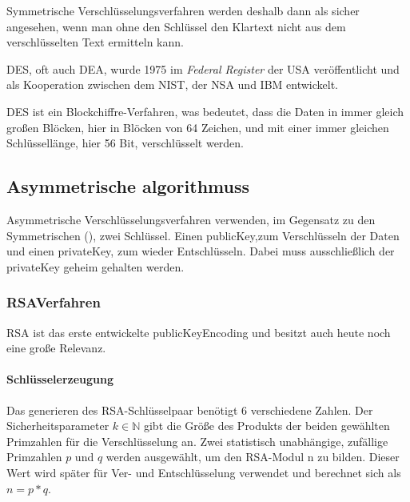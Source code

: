 Symmetrische Verschlüsselungsverfahren werden deshalb dann als sicher angesehen, wenn man ohne den Schlüssel den Klartext nicht aus dem verschlüsselten Text ermitteln kann.\autocite[\pagef~5]{kryptographische-algorithmen}

\ac{DES}, oft auch \ac{DEA}, wurde 1975 im \textit{Federal Register} der USA
veröffentlicht und als Kooperation zwischen dem \ac{NIST}, der \ac{NSA} und \ac{IBM} entwickelt.\autocite[\pagef~232]{nsa-meyer}

\ac{DES} ist ein Blockchiffre-Verfahren, was bedeutet, dass die Daten in immer gleich großen Blöcken, hier in Blöcken von 64 Zeichen, und mit einer immer gleichen Schlüssellänge, hier 56 Bit, verschlüsselt werden.\autocite[\pagef~6]{kryptographische-algorithmen}


\subsection[Asymmetrische Algorithmen]{Asymmetrische \glspl{algorithmus}}\label{subsec:asymmetrische-algorithmen}
Asymmetrische Verschlüsselungsverfahren verwenden, im Gegensatz zu den Symmetrischen (\solol), zwei Schlüssel.
Einen \gls{publicKey},zum Verschlüsseln der Daten und einen \gls{privateKey}, zum wieder Entschlüsseln.
Dabei muss ausschließlich der \gls{privateKey} geheim gehalten werden.


\subsubsection[RSA-Verfahren]{\acs{RSA}\nonbreakdash Verfahren}\label{subsubsec:rsa-verfahren}

\ac{RSA} ist das erste entwickelte \gls{publicKeyEncoding} und besitzt auch heute noch eine große Relevanz.\autocite[\pagef~168]{buchmann-einfuhrung-2016}

\paragraph[Schlüsselerzeugung]{Schlüsselerzeugung}\label{par:schluesselerzeugung}
Das generieren des \ac{RSA}-Schlüsselpaar benötigt $6$ verschiedene Zahlen. Der Sicherheitsparameter $k \in \mathbb{N}$ gibt die Größe des Produkts der beiden gewählten Primzahlen für die Verschlüsselung an. Zwei statistisch unabhängige, zufällige Primzahlen $p$ und $q$ werden ausgewählt, um den \ac{RSA}-Modul n zu bilden. Dieser Wert wird später für Ver- und Entschlüsselung verwendet und berechnet sich als $n = p*q$.

